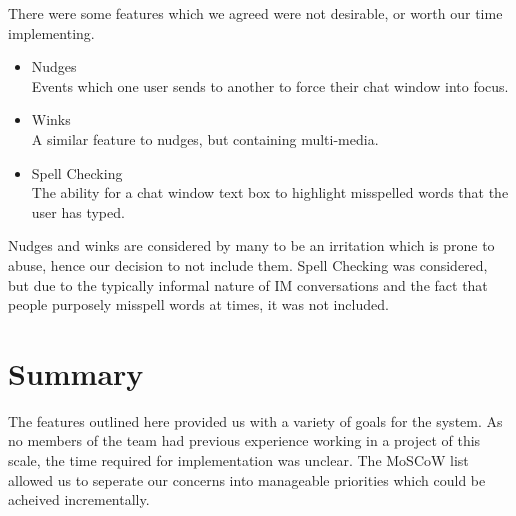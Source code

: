 There were some features which we agreed were not desirable, or worth our time implementing.

\begin{itemize}

\item{Nudges\\
	Events which one user sends to another to force their chat window into focus.}
\item{Winks\\
	A similar feature to nudges, but containing multi-media.}
\item{Spell Checking\\
	The ability for a chat window text box to highlight misspelled words that the user has typed.}

\end{itemize}

Nudges and winks are considered by many to be an irritation which is prone to abuse, hence our decision to not include them. Spell Checking was considered, but due to the typically informal nature of IM conversations and the fact that people purposely misspell words at times, it was not included.

\section{Summary}
The features outlined here provided us with a variety of goals for the system. As no members of the team had previous experience working in a project of this scale, the time required for implementation was unclear. The MoSCoW list allowed us to seperate our concerns into manageable priorities which could be acheived incrementally.
